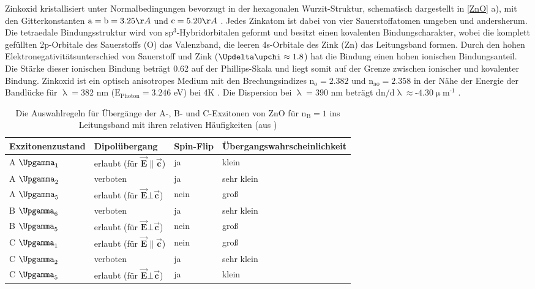 Zinkoxid kristallisiert unter Normalbedingungen bevorzugt in der hexagonalen Wurzit-Struktur, schematisch dargestellt in \autoref{ZnO} a), mit den Gitterkonstanten \mbox{$\text{a}= \text{b} = \text{3.25} \AA$} und $\text{c} = \text{5.20} \AA$ \cite{Klingshirn.2010}. Jedes Zinkatom ist dabei von vier Sauerstoffatomen \mbox{umgeben} und andersherum. Die tetraedale Bindungsstruktur wird von $\text{sp}^\text{3}$-Hybridorbitalen \mbox{geformt} und besitzt einen kovalenten Bindungscharakter, wobei die komplett \mbox{gefüllten} \mbox{2p-Orbitale} des Sauerstoffs (O) das Valenzband, die leeren 4s-Orbitale des Zink (Zn) das Leitungsband formen. Durch den hohen Elektronegativitätsunterschied  von \mbox{Sauerstoff} und Zink ($\Updelta\upchi\approx \text{1.8}$) hat die Bindung einen hohen ionischen Bindungsanteil. Die Stärke dieser ionischen Bindung beträgt 0.62 auf der Phillips-Skala \cite{Ivanov.1981} und liegt somit auf der Grenze zwischen ionischer und kovalenter Bindung.  Zinkoxid ist ein optisch anisotropes Medium mit den Brechungsindizes $\text{n}_\text{o}= \text{2.382}$  und $\text{n}_\text{ao}= \text{2.358}$ in der Nähe der Energie der Bandlücke für $\uplambda= \text{382}$ nm ($\text{E}_\text{Photon}= \text{3.246}$ eV) bei 4K \cite{Park.1968}. Die Dispersion bei $\uplambda=\text{390 nm}$ beträgt $\text{d} \text{n}/\text{d} \uplambda\approx \text{-4.30} \upmu \text{m}^\text{-1}$ \cite{Bond.1965}.
\begin{table}[h]
\centering
\begin{footnotesize}
\begin{tabular}{llll}
Exzitonenzustand & Dipolübergang & Spin-Flip & Übergangswahrscheinlichkeit\\
\toprule
A $\Upgamma_\text{1}$ & erlaubt (für $\vec{\textbf{E}} \| \vec{\textbf{c}}$) & ja & klein\\
A $\Upgamma_\text{2}$ & verboten & ja & sehr klein\\
A $\Upgamma_\text{5}$ & erlaubt (für $\vec{\textbf{E}} \bot \vec{\textbf{c}}$) & nein & groß\\
\midrule
B $\Upgamma_\text{6}$ & verboten & ja & sehr klein\\
B $\Upgamma_\text{5}$ & erlaubt (für $\vec{\textbf{E}} \bot \vec{\textbf{c}}$) & nein & groß\\
\midrule
C $\Upgamma_\text{1}$ & erlaubt (für $\vec{\textbf{E}} \| \vec{\textbf{c}}$) & nein & groß\\
C $\Upgamma_\text{2}$ & verboten & ja & sehr klein\\
C $\Upgamma_\text{5}$ & erlaubt (für $\vec{\textbf{E}} \bot \vec{\textbf{c}}$) & ja & klein\\
\end{tabular}
\end{footnotesize}
\caption[Auswahlregeln der Anregung für Exzitonen]{Die Auswahlregeln für Übergänge der A-, B- und C-Exzitonen von ZnO für $\text{n}_\text{B}=\text{1}$ ins Leitungsband mit ihren relativen Häufigkeiten (aus \cite{Klingshirn.2010})}
\label{spinueb}
\end{table}
